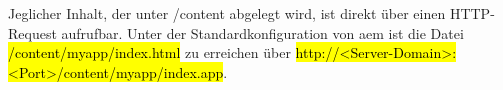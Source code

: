 Jeglicher Inhalt, der unter /content abgelegt wird, ist direkt über einen HTTP-Request aufrufbar. Unter der Standardkonfiguration von \ac{aem} ist die Datei \hl{/content/myapp/index.html} zu erreichen über \hl{http://<Server-Domain>:<Port>/content/myapp/index.app}. 